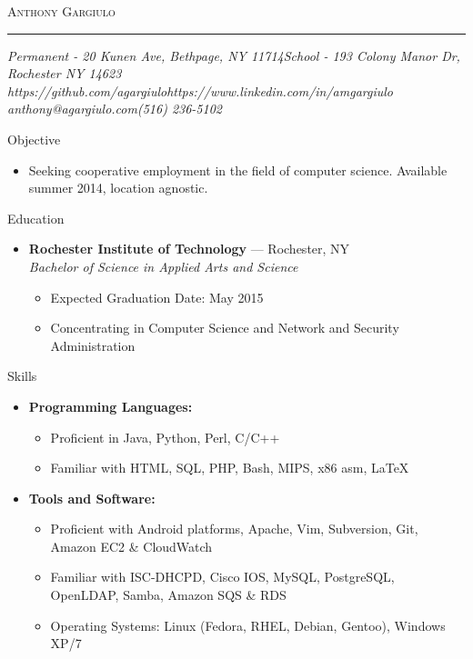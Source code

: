\documentclass[10pt,oneside]{article}
\makeatletter
\newcommand{\name}{Anthony Gargiulo}
\newcommand{\addr}{Permanent - 20 Kunen Ave, Bethpage, NY 11714}
\newcommand{\schoolAddr}{School - 193 Colony Manor Dr, Rochester NY 14623}
\newcommand{\mobilePhone}{(516) 236-5102}
\newcommand{\email}{anthony@agargiulo.com}
\newcommand{\github}{https://github.com/agargiulo}
\newcommand{\linkedin}{https://www.linkedin.com/in/amgargiulo}
\newcommand{\bigname}[1]{
	\begin{center}\fontfamily{ppl}\selectfont\Huge\scshape#1\end{center}
}
\newenvironment{ressection}[1]{
	\vspace{3pt}
	{\fontfamily{ppl}\selectfont\Large#1}
	\begin{itemize}
	\vspace{2pt}
}{
	\end{itemize}
}
\newcommand{\resitem}[1]{
	\vspace{-2pt}
	\item \begin{flushleft} #1 \end{flushleft}
}
\newcommand{\ressubitem}[1]{
	\vspace{-1pt}
	\item \begin{flushleft} #1 \end{flushleft}
}
\newcommand{\resbigitem}[3]{
	\vspace{-3pt}
	\item
	\textbf{#1} --- #2 \\
	\textit{#3}
}
\newenvironment{ressubsec}[3]{
	\resbigitem{#1}{#2}{#3}
	\vspace{-1pt}
	\begin{itemize}
}{
	\end{itemize}
}
\newenvironment{reslist}[1]{
	\resitem{\textbf{#1}}
	\vspace{-3pt}
	\begin{itemize}
}{
	\end{itemize}
}
\makeatother
\begin{document}
 \selectfont

\bigname{\name}

\vspace{-4pt} \rule{\textwidth}{1pt}

\vspace{-1pt} {\normalsize\itshape \addr \hfill \schoolAddr \\ \github \hfill \linkedin \\ \email \hfill \mobilePhone}

\vspace{15 pt}



\begin{ressection}{Objective}

	\ressubitem{Seeking cooperative employment in the field of computer science. Available summer 2014, location agnostic.}

\end{ressection}


\begin{ressection}{Education}

	\begin{ressubsec}{Rochester Institute of Technology}{Rochester, NY}{Bachelor of Science in Applied Arts and Science}
		\ressubitem{Expected Graduation Date: May 2015}
		\ressubitem{Concentrating in Computer Science and Network and Security Administration}
	\end{ressubsec}

\end{ressection}


\begin{ressection}{Skills}


	\begin{reslist}{Programming Languages:}
		\ressubitem{Proficient in Java, Python, Perl, C/C++}
		\ressubitem{Familiar with HTML, SQL, PHP, Bash, MIPS, x86 asm, \LaTeX}
	\end{reslist}

	\begin{reslist}{Tools and Software:}
		\ressubitem{Proficient with Android platforms, Apache, Vim, Subversion, Git, Amazon EC2 \& CloudWatch}
		\ressubitem{Familiar with ISC-DHCPD, Cisco IOS, MySQL, PostgreSQL, OpenLDAP, Samba, Amazon SQS \& RDS}
		\ressubitem{Operating Systems: Linux (Fedora, RHEL, Debian, Gentoo), Windows XP/7}
	\end{reslist}

\end{ressection}
\end{document}
